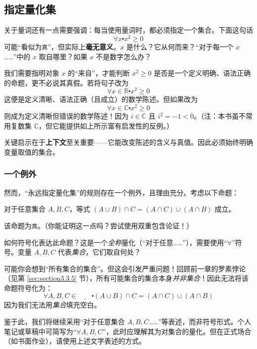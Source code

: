 \subsection{指定量化集}

关于量词还有一点需要强调：每当使用量词时，都必须指定一个集合。下面这句话
\[\forall x \centerdot x^2 \ge 0\]
可能``看似为\verb|真|''，但实际上\textbf{毫无意义}。$x$ 是什么？它从何而来？``对于每一个 $x$……''中的 $x$ 取自哪里？如果 $x$ 不是数字怎么办？

我们需要指明对象 $x$ 的``来自''，才能判断 $x^2 \ge 0$ 是否是一个定义明确、语法正确的命题，更不必说其真假。若将句子改为
\[\forall x \in \mathbb{R} \centerdot x^2 \ge 0\]
这便是定义清晰、语法正确（且成立）的数学陈述。但如果改为
\[\forall x \in \mathbb{C} \centerdot x^2 \ge 0\]
则成为定义清晰但错误的数学陈述！因为 $i \in \mathbb{C}$ 且 $i^2 = -1 < 0$。（注：本书虽不常用复数集 $\mathbb{C}$，但它能提供如上所示富有启发性的反例。）

关键启示在于\textbf{上下文}至关重要——它能改变陈述的含义与真值。因此必须始终明确变量取值的集合。

\subsubsection*{一个例外}

然而，``永远指定量化集''的规则存在一个例外，且理由充分。考虑以下命题：
\begin{center}
    对于任意集合 $A, B,C$，等式 $(A \cup B) \cap C = (A \cap C) \cup (A \cap B)$ 成立。
\end{center}
该命题为\verb|真|。（你能证明这一点吗？尝试使用双重包含论证！）

如何符号化表达此命题？这是一个\emph{全称}量化（``对于任意……''），需要使用``$\forall$''符号。变量 $A,B,C$ 代表\emph{集合}，它们取自何处？

可能你会想到``所有集合的集合''。但这会引发严重问题！回顾前一章的罗素悖论（见第 \ref{sec:section3.3.5} 节），所有可能集合的集合本身\emph{并非集合}！因此无法将该命题符号化为：
\[\forall A, B,C \in \underline{\qquad} \centerdot (A \cup B) \cap C = (A \cap C) \cup (A \cap B)\]
因为我们无法用\emph{集合}填充空白。

鉴于此，我们将继续采用``对于任意集合 $A,B,C$……''等表述，而非符号形式。个人笔记或草稿中可简写为``$\forall A,B,C$''，此时应理解其为对集合的量化。但在正式场合（如书面作业），请使用上述文字表述的方式。

\clearpage
